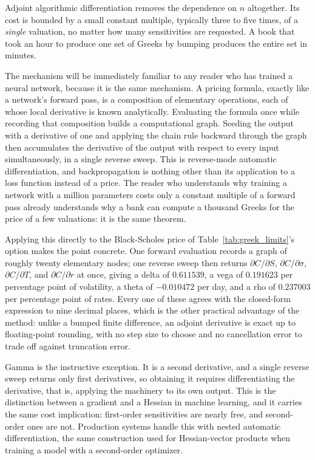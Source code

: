 \documentclass[../ai_in_finance]{subfiles}
\begin{document}
Adjoint algorithmic differentiation removes the dependence on $n$ altogether. Its cost is bounded by a small constant multiple, typically three to five times, of a \emph{single} valuation, no matter how many sensitivities are requested. A book that took an hour to produce one set of Greeks by bumping produces the entire set in minutes.

The mechanism will be immediately familiar to any reader who has trained a neural network, because it is the same mechanism. A pricing formula, exactly like a network's forward pass, is a composition of elementary operations, each of whose local derivative is known analytically. Evaluating the formula once while recording that composition builds a computational graph. Seeding the output with a derivative of one and applying the chain rule backward through the graph then accumulates the derivative of the output with respect to every input simultaneously, in a single reverse sweep. This is reverse-mode automatic differentiation, and backpropagation is nothing other than its application to a loss function instead of a price. The reader who understands why training a network with a million parameters costs only a constant multiple of a forward pass already understands why a bank can compute a thousand Greeks for the price of a few valuations: it is the same theorem.

Applying this directly to the Black-Scholes price of Table~\ref{tab:greek_limits}'s option makes the point concrete. One forward evaluation records a graph of roughly twenty elementary nodes; one reverse sweep then returns $\partial C/\partial S$, $\partial C/\partial \sigma$, $\partial C/\partial T$, and $\partial C/\partial r$ at once, giving a delta of $0.611539$, a vega of $0.191623$ per percentage point of volatility, a theta of $-0.010472$ per day, and a rho of $0.237003$ per percentage point of rates. Every one of these agrees with the closed-form expression to nine decimal places, which is the other practical advantage of the method: unlike a bumped finite difference, an adjoint derivative is exact up to floating-point rounding, with no step size to choose and no cancellation error to trade off against truncation error.

Gamma is the instructive exception. It is a second derivative, and a single reverse sweep returns only first derivatives, so obtaining it requires differentiating the derivative, that is, applying the machinery to its own output. This is the distinction between a gradient and a Hessian in machine learning, and it carries the same cost implication: first-order sensitivities are nearly free, and second-order ones are not. Production systems handle this with nested automatic differentiation, the same construction used for Hessian-vector products when training a model with a second-order optimizer.
\end{document}

